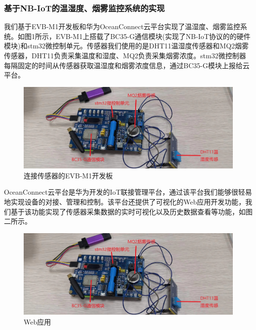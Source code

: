 \documentclass{ctexart}
\begin{document}
	\subsubsection{基于NB-IoT的温湿度、烟雾监控系统的实现}
	我们基于EVB-M1开发板和华为OceanConnect云平台实现了温湿度、烟雾监控系统。如图1所示，EVB-M1上搭载了BC35-G通信模块(实现了NB-IoT协议的的硬件模块)和stm32微控制单元。传感器我们使用的是DHT11温湿度传感器和MQ2烟雾传感器，DHT11负责采集温度和湿度、MQ2负责采集烟雾浓度。stm32微控制器每隔固定的时间从传感器获取温湿度和烟雾浓度信息，通过BC35-G模块上报给云平台。\par
	\begin{figure}
		\centering
		\includegraphics[scale=0.2]{1.jpg}
		\caption{连接传感器的EVB-M1开发板}
		\label{图1}
	\end{figure}
	OceanConnect云平台是华为开发的IoT联接管理平台，通过该平台我们能够很轻易地实现设备的对接、管理和控制。该平台还提供了可视化的Web应用开发功能，我们基于该功能实现了传感器采集数据的实时可视化以及历史数据查看等功能，如图二所示。
	\begin{figure}
		\centering
		\includegraphics[scale=0.2]{1.jpg}
		\caption{Web应用}
		\label{图2}
	\end{figure}
\end{document}
